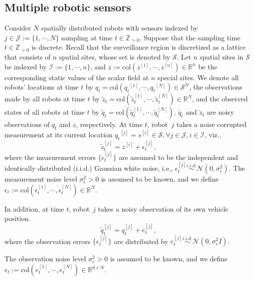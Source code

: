 \documentclass[letterpaper, 10 pt, conference]{ieeeconf}
\newcommand{\set}[1]{\{#1\}} \newcommand{\norm}[1]{\|#1\|}
\newcommand{\mc}[1]{\mathcal{#1}} \newcommand{\mb}[1]{\mathbf{#1}}
\newcommand{\Real}{\mathbb{R}}
\newcommand{\Integer}{\mathbb{Z}}
\newcommand{\ZPlus}{\mathbb{Z}_{>0}}
\newcommand{\q}[1]{{q_{#1}}}
\newcommand{\tildez}[1]{{\tilde{z}_{#1}}}
\newcommand{\tildeq}[1]{{\tilde{q}_{#1}}}
\newcommand{\tildezi}[2]{{\tilde{z}_{#2}^{[#1]}}}
\newcommand{\tildeqi}[2]{{\tilde{q}_{#2}^{[#1]}}}
\begin{document}
\subsection{Multiple robotic sensors}
Consider $N$ spatially distributed robots with sensors indexed by $j \in \mc{J} := \set{1,\cdots,N}$ sampling at time $t \in \Integer_{>0}$. Suppose that the sampling time $t \in \ZPlus$ is discrete. 
Recall that the surveillance region is   discretized as a lattice that consists of $n$ spatial sites,  whose set  is denoted by $\mc{S}$. Let $n$ spatial sites in $\mc{S}$ be indexed by $\mc{I}:=\{1, \cdots, n\}$, and $z := \text{col} \left ( z^{[1]},\cdots,z^{[n]} \right ) \in \Real^{n}$ be the corresponding static values of the scalar field at $n$ special sites. 
We denote all robots' locations at time $t$ by $\q{t} = \text{col} \left(\q{t}^{[1]}, \cdots,\q{t}^{[N]}\right) \in \mc{S}^N$, the observations made by all robots at time $t$ by $\tildez{t} = \text{col} \left(\tildezi{1}{t},\cdots,\tildezi{N}{t}\right) \in \Real^N$, and the observed states of all robots at time $t$ by $\tildeq{t} = \text{col} \left( {\tildeqi{1}{t}},\cdots,\tildeqi{N}{t}\right)$. $\tilde{q}_t$ and $\tilde{z}_t$ are noisy observations of $q_t$ and $z$, respectively. At time $t$, robot~$j$ takes a noise corrupted measurement at its current location $\q{t}^{[j]} = s^{[i]} \in \mc{S}, \forall j \in \mc{J}, i \in \mc{I}$, viz.,
\begin{equation}
 \tildezi{j}{t}= z^{[i]} + \epsilon_{t}^{[j]}, 
	\label{eq:z_noise}
\end{equation}
where the measurement errors $\{\epsilon_{t}^{[j]} \}$ are assumed to be the 
 independent and identically distributed (i.i.d.) Gaussian white noise, i.e., $\epsilon_{t}^{[j]}
 \overset{i.i.d.}{\sim} \mc{N}(0,\sigma_{\epsilon}^2)$. The measurement noise level $\sigma_{\epsilon}^2 > 0$ is assumed to be known, and we define $\epsilon_t:=\text{col} \left (\epsilon_t^{[1]},\cdots,\epsilon_t^{[N]} \right ) \in \Real^N$. 

In addition, at time $t$, robot~$j$ takes a noisy observation of its own vehicle position.
\begin{equation}
 \tildeqi{j}{t}= q_{t}^{[j]} + e_{t}^{[j]}, 
 \label{eq:q_noise}
\end{equation}
where the observation errors $\{e_{t}^{[j]} \}$ are distributed by 
$e_{t}^{[j]}
 \overset{i.i.d.}{\sim} \mc{N}(0,\sigma_{e}^2I).$

 The observation noise level $\sigma_{e}^2 > 0$ is assumed to be known, and we define $e_t:= \text{col} \left (e_t^{[1]},\cdots,e_t^{[N]} \right ) \in \Real^{d \times N}$. 
\end{document}
